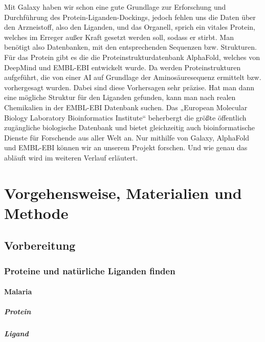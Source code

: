 \documentclass[11pt]{article}
\begin{document}
    Mit Galaxy haben wir schon eine gute Grundlage zur Erforschung und Durchführung des Protein-Liganden-Dockings, jedoch fehlen uns die Daten über den Arzneistoff, also den Liganden, und das Organell, sprich ein vitales Protein, welches im Erreger außer Kraft gesetzt werden soll, sodass er stirbt. Man benötigt also Datenbanken, mit den entsprechenden Sequenzen bzw. Strukturen. Für das Protein gibt es die die Proteinstrukturdatenbank AlphaFold, welches von DeepMind und EMBL-EBI entwickelt wurde. Da werden Proteinstrukturen aufgeführt, die von einer AI auf Grundlage der Aminosäuresequenz ermittelt bzw. vorhergesagt wurden. Dabei sind diese Vorhersagen sehr präzise. Hat man dann eine mögliche Struktur für den Liganden gefunden, kann man nach realen Chemikalien in der EMBL-EBI Datenbank suchen. Das „European Molecular Biology Laboratory Bioinformatics Institute“ beherbergt die größte öffentlich zugängliche biologische Datenbank und bietet gleichzeitig auch bioinformatische Dienste für Forschende aus aller Welt an. Nur mithilfe von Galaxy, AlphaFold und EMBL-EBI können wir an unserem Projekt forschen. Und wie genau das abläuft wird im weiteren Verlauf erläutert.


    \section{Vorgehensweise, Materialien und Methode}\label{sec:vorgehensweise-materialien-und-methode}

    \subsection{Vorbereitung}\label{subsec:vorbereitung}


    \subsubsection{Proteine und natürliche Liganden finden}

    \paragraph{Malaria}

    \subparagraph{Protein}

    \subparagraph{Ligand}
\end{document}
